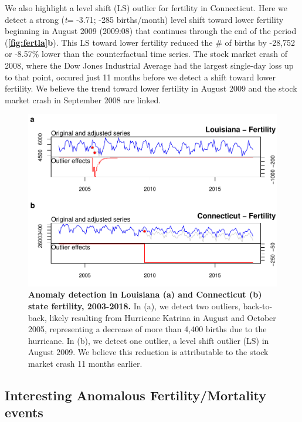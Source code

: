 \documentclass[12pt]{article}
\begin{document}
We also highlight a level shift (LS) outlier for fertility in
Connecticut. Here we detect a strong (\emph{t}= -3.71; -285
births/month) level shift toward lower fertility beginning in August
2009 (2009:08) that continues through the end of the period
(\textbf{\autoref{fig:fertla}b}). This LS toward lower fertility reduced
the \# of births by -28,752 or -8.57\% lower than the counterfactual
time series. The stock market crash of 2008, where the Dow Jones
Industrial Average had the largest single-day loss up to that point,
occured just 11 months before we detect a shift toward lower fertility.
We believe the trend toward lower fertility in August 2009 and the stock
market crash in September 2008 are linked.

\begin{figure}
\centering
\includegraphics{manuscript_files/figure-latex/FertilityLouisiana-1.pdf}
\caption{\textbf{Anomaly detection in Louisiana (a) and Connecticut (b) state fertility, 2003-2018.}
In (a), we detect two outliers, back-to-back, likely resulting from
Hurricane Katrina in August and October 2005, representing a decrease of
more than 4,400 births due to the hurricane. In (b), we detect one
outlier, a level shift outlier (LS) in August 2009. We believe this
reduction is attributable to the stock market crash 11 months earlier.
\label{fig:fertla}}
\end{figure}

\hypertarget{interesting-anomalous-fertilitymortality-events}{%
\subsection{Interesting Anomalous Fertility/Mortality
events}\label{interesting-anomalous-fertilitymortality-events}}
\end{document}
